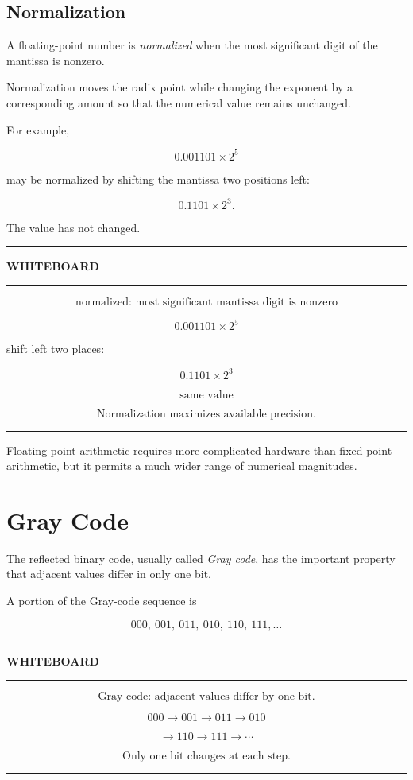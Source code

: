 \documentclass[11pt]{article}
\newenvironment{whiteboard}
{
    \par\medskip
    \begin{center}
    \begin{minipage}{0.94\textwidth}
    \hrule
    \vspace{0.4em}
    \textbf{\large WHITEBOARD}
    \vspace{0.3em}
    \hrule
    \vspace{0.7em}
}
{
    \vspace{0.5em}
    \hrule
    \end{minipage}
    \end{center}
    \medskip
}
\begin{document}
\subsection{Normalization}

A floating-point number is \emph{normalized} when the most significant digit
of the mantissa is nonzero.

Normalization moves the radix point while changing the exponent by a
corresponding amount so that the numerical value remains unchanged.

For example,

\[
0.001101\times2^5
\]

may be normalized by shifting the mantissa two positions left:

\[
0.1101\times2^3.
\]

The value has not changed.

\begin{whiteboard}
\[
\boxed{\text{normalized: most significant mantissa digit is nonzero}}
\]

\[
0.001101\times2^5
\]

shift left two places:

\[
0.1101\times2^3
\]

\[
\boxed{\text{same value}}
\]

\[
\boxed{\text{Normalization maximizes available precision.}}
\]
\end{whiteboard}

Floating-point arithmetic requires more complicated hardware than fixed-point
arithmetic, but it permits a much wider range of numerical magnitudes.

\section{Gray Code}

The reflected binary code, usually called \emph{Gray code}, has the important
property that adjacent values differ in only one bit.

A portion of the Gray-code sequence is

\[
000,\ 001,\ 011,\ 010,\ 110,\ 111,\ldots
\]

\begin{whiteboard}
\[
\boxed{\text{Gray code: adjacent values differ by one bit.}}
\]

\[
000\rightarrow001\rightarrow011\rightarrow010
\]

\[
\rightarrow110\rightarrow111\rightarrow\cdots
\]

\[
\boxed{\text{Only one bit changes at each step.}}
\]
\end{whiteboard}
\end{document}
